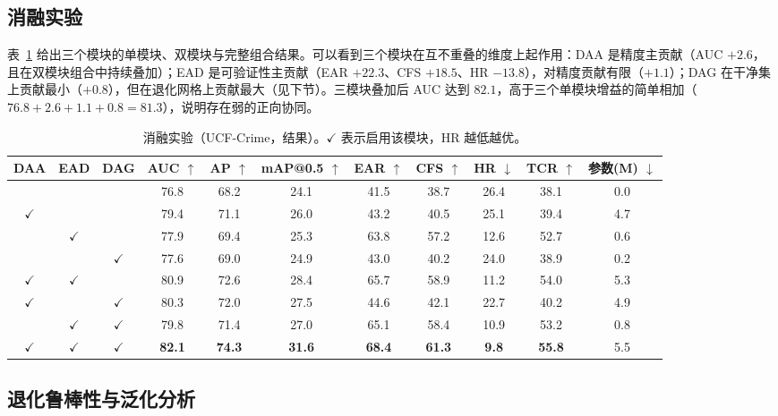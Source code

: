 \subsection{消融实验}

表~\ref{tab:ablation} 给出三个模块的单模块、双模块与完整组合结果。可以看到三个模块在互不重叠的维度上起作用：DAA 是精度主贡献（AUC $+2.6$，且在双模块组合中持续叠加）；EAD 是可验证性主贡献（EAR $+22.3$、CFS $+18.5$、HR $-13.8$），对精度贡献有限（$+1.1$）；DAG 在干净集上贡献最小（$+0.8$），但在退化网格上贡献最大（见下节）。三模块叠加后 AUC 达到 $82.1$，高于三个单模块增益的简单相加（$76.8+2.6+1.1+0.8 = 81.3$），说明存在弱的正向协同。

\begin{table}[t]
\centering
\small
\caption{消融实验（UCF-Crime，结果）。$\checkmark$ 表示启用该模块，HR 越低越优。}
\label{tab:ablation}
\begin{tabular}{ccccccccccc}
\toprule
DAA & EAD & DAG & AUC $\uparrow$ & AP $\uparrow$ & mAP@0.5 $\uparrow$ & EAR $\uparrow$ & CFS $\uparrow$ & HR $\downarrow$ & TCR $\uparrow$ & 参数(M) $\downarrow$ \\
\midrule
     &     &     & 76.8 & 68.2 & 24.1 & 41.5 & 38.7 & 26.4 & 38.1 & 0.0 \\
$\checkmark$ &   &   & 79.4 & 71.1 & 26.0 & 43.2 & 40.5 & 25.1 & 39.4 & 4.7 \\
   & $\checkmark$ &   & 77.9 & 69.4 & 25.3 & 63.8 & 57.2 & 12.6 & 52.7 & 0.6 \\
   &   & $\checkmark$ & 77.6 & 69.0 & 24.9 & 43.0 & 40.2 & 24.0 & 38.9 & 0.2 \\
$\checkmark$ & $\checkmark$ &   & 80.9 & 72.6 & 28.4 & 65.7 & 58.9 & 11.2 & 54.0 & 5.3 \\
$\checkmark$ &   & $\checkmark$ & 80.3 & 72.0 & 27.5 & 44.6 & 42.1 & 22.7 & 40.2 & 4.9 \\
   & $\checkmark$ & $\checkmark$ & 79.8 & 71.4 & 27.0 & 65.1 & 58.4 & 10.9 & 53.2 & 0.8 \\
$\checkmark$ & $\checkmark$ & $\checkmark$ & \textbf{82.1} & \textbf{74.3} & \textbf{31.6} & \textbf{68.4} & \textbf{61.3} & \textbf{9.8} & \textbf{55.8} & 5.5 \\
\bottomrule
\end{tabular}
\end{table}

\subsection{退化鲁棒性与泛化分析}

